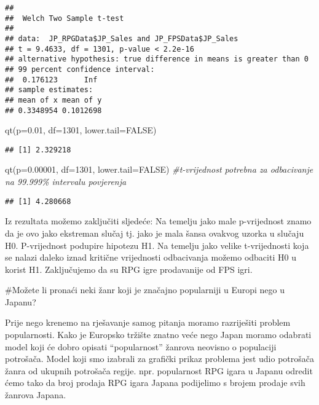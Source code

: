 \documentclass[
]{article}
\newenvironment{Shaded}{\begin{snugshade}}{\end{snugshade}}
\newcommand{\AttributeTok}[1]{\textcolor[rgb]{0.77,0.63,0.00}{#1}}
\newcommand{\CommentTok}[1]{\textcolor[rgb]{0.56,0.35,0.01}{\textit{#1}}}
\newcommand{\ConstantTok}[1]{\textcolor[rgb]{0.00,0.00,0.00}{#1}}
\newcommand{\DecValTok}[1]{\textcolor[rgb]{0.00,0.00,0.81}{#1}}
\newcommand{\FloatTok}[1]{\textcolor[rgb]{0.00,0.00,0.81}{#1}}
\newcommand{\FunctionTok}[1]{\textcolor[rgb]{0.00,0.00,0.00}{#1}}
\newcommand{\NormalTok}[1]{#1}
\begin{document}
\begin{verbatim}
## 
##  Welch Two Sample t-test
## 
## data:  JP_RPGData$JP_Sales and JP_FPSData$JP_Sales
## t = 9.4633, df = 1301, p-value < 2.2e-16
## alternative hypothesis: true difference in means is greater than 0
## 99 percent confidence interval:
##  0.176123      Inf
## sample estimates:
## mean of x mean of y 
## 0.3348954 0.1012698
\end{verbatim}

\begin{Shaded}
\begin{Highlighting}[]
\FunctionTok{qt}\NormalTok{(}\AttributeTok{p=}\FloatTok{0.01}\NormalTok{, }\AttributeTok{df=}\DecValTok{1301}\NormalTok{, }\AttributeTok{lower.tail=}\ConstantTok{FALSE}\NormalTok{)}
\end{Highlighting}
\end{Shaded}

\begin{verbatim}
## [1] 2.329218
\end{verbatim}

\begin{Shaded}
\begin{Highlighting}[]
\FunctionTok{qt}\NormalTok{(}\AttributeTok{p=}\FloatTok{0.00001}\NormalTok{, }\AttributeTok{df=}\DecValTok{1301}\NormalTok{, }\AttributeTok{lower.tail=}\ConstantTok{FALSE}\NormalTok{) }\CommentTok{\#t{-}vrijednost potrebna za odbacivanje na 99.999\% intervalu povjerenja}
\end{Highlighting}
\end{Shaded}

\begin{verbatim}
## [1] 4.280668
\end{verbatim}

Iz rezultata možemo zaključiti sljedeće: Na temelju jako male
p-vrijednost znamo da je ovo jako ekstreman slučaj tj. jako je mala
šansa ovakvog uzorka u slučaju H0. P-vrijednost podupire hipotezu H1. Na
temelju jako velike t-vrijednosti koja se nalazi daleko iznad kritične
vrijednosti odbacivanja možemo odbaciti H0 u korist H1. Zaključujemo da
su RPG igre prodavanije od FPS igri.

\#Možete li pronaći neki žanr koji je značajno popularniji u Europi nego
u Japanu?

Prije nego krenemo na rješavanje samog pitanja moramo razriješiti
problem popularnosti. Kako je Europsko tržište znatno veće nego Japan
moramo odabrati model koji će dobro opisati ``popularnost'' žanrova
neovisno o populaciji potrošača. Model koji smo izabrali za grafički
prikaz problema jest udio potrošača žanra od ukupnih potrošača regije.
npr. popularnost RPG igara u Japanu odredit ćemo tako da broj prodaja
RPG igara Japana podijelimo s brojem prodaje svih žanrova Japana.
\end{document}
